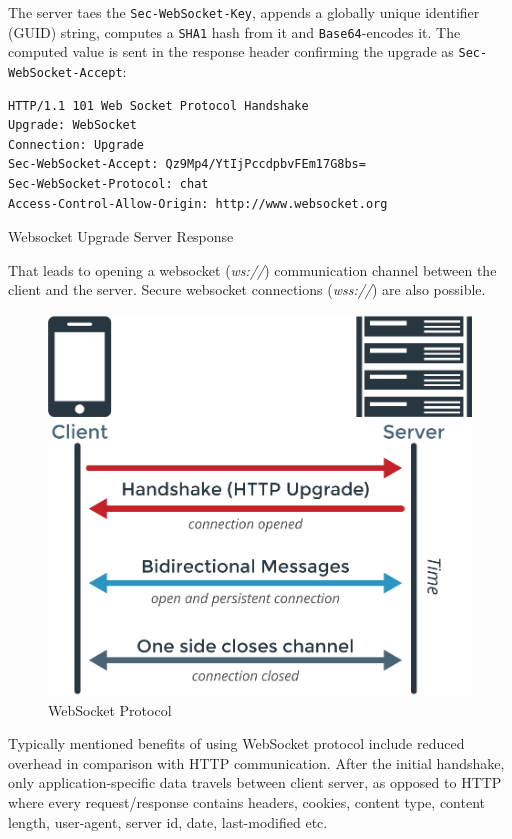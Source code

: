 \documentclass{uvamscse}
\begin{document}
The server taes the \texttt{Sec-WebSocket-Key}, appends a globally unique identifier (GUID) string, computes a \texttt{SHA1} hash from it and \texttt{Base64}-encodes it. The computed value is sent in the response header confirming the upgrade as \texttt{Sec-WebSocket-Accept}:

\begin{sourcecode}
\begin{lstlisting}[style=mono]
HTTP/1.1 101 Web Socket Protocol Handshake
Upgrade: WebSocket
Connection: Upgrade
Sec-WebSocket-Accept: Qz9Mp4/YtIjPccdpbvFEm17G8bs=
Sec-WebSocket-Protocol: chat
Access-Control-Allow-Origin: http://www.websocket.org
\end{lstlisting}
\caption{Websocket Upgrade Server Response}
\end{sourcecode}

That leads to opening a websocket (\textit{ws://}) communication channel between the client and the server. Secure websocket connections (\textit{wss://}) are also possible.

\begin{figure}[H]
\centering
\includegraphics[scale=0.3]{ws}
\caption{WebSocket Protocol}
\end{figure}

Typically mentioned benefits of using WebSocket protocol include reduced overhead in comparison with HTTP communication. After the initial handshake, only application-specific data travels between client server, as opposed to HTTP where every request/response contains headers, cookies, content type, content length, user-agent, server id, date, last-modified etc.
\end{document}

